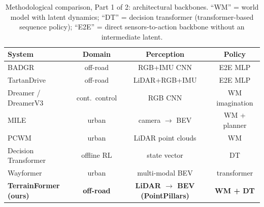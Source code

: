 \documentclass[sensors,article,submit,pdftex,moreauthors]{Definitions/mdpi}
\begin{document}
\begin{table}[h]
\caption{Methodological comparison, Part 1 of 2: architectural backbones. ``WM'' = world model with latent dynamics; ``DT'' = decision transformer (transformer-based sequence policy); ``E2E'' = direct sensors-to-action backbone without an intermediate latent.}
\label{tab:method_arch}
\centering
\footnotesize
\begin{tabular}{lccc}
\toprule
System & Domain & Perception & Policy \\
\midrule
BADGR \cite{kahn2021}              & off-road  & RGB+IMU CNN          & E2E MLP        \\
TartanDrive \cite{triest2023}      & off-road  & LiDAR+RGB+IMU        & E2E MLP        \\
Dreamer / DreamerV3 \cite{hafner2020,hafner2023} & cont.\ control & RGB CNN        & WM imagination \\
MILE \cite{hu2022}                 & urban     & camera $\to$ BEV     & WM + planner   \\
PCWM \cite{yang2023}               & urban     & LiDAR point clouds   & WM             \\
Decision Transformer \cite{chen2021}& offline RL& state vector         & DT             \\
Wayformer \cite{nayakanti2023}     & urban     & multi-modal BEV      & transformer    \\
\textbf{TerrainFormer (ours)}      & \textbf{off-road} & \textbf{LiDAR $\to$ BEV (PointPillars)} & \textbf{WM + DT} \\
\bottomrule
\end{tabular}
\end{table}
\end{document}
